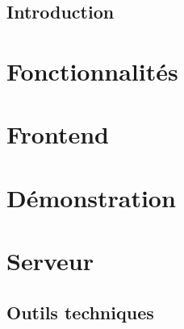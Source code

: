 

\subsection{Introduction}


\section*{Fonctionnalités}
\subsection{}






\section*{Frontend}
\subsection{}

\subsection{}


\section*{Démonstration}


\section*{Serveur}
\subsection{}


\subsection{Outils techniques}


